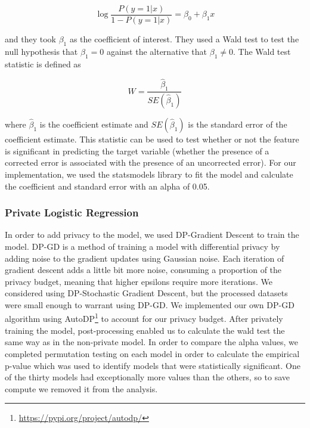 \documentclass[12pt,letterpaper]{article}
\begin{document}
\begin{equation}
    \label{eq:logistic_regression}
    \log \frac{P(y=1|x)}{1-P(y=1|x)} = \beta_0 + \beta_1 x
\end{equation}

and they took $\beta_1$ as the coefficient of interest.
They used a Wald test to test the null hypothesis that $\beta_1 = 0$ against the alternative that $\beta_1 \neq 0$.
The Wald test statistic is defined as 

\begin{equation}
    \label{eq:wald_test}
    W = \frac{\hat{\beta}_1}{SE(\hat{\beta}_1)}
\end{equation}

where $\hat{\beta}_1$ is the coefficient estimate and $SE(\hat{\beta}_1)$ is the standard error of the coefficient estimate.
This statistic can be used to test whether or not the feature is significant in predicting the target variable (whether the presence of a corrected error is associated with the presence of an uncorrected error).
For our implementation, we used the statsmodels library to fit the model and calculate the coefficient and standard error with an alpha of 0.05.

\subsubsection{Private Logistic Regression}

In order to add privacy to the model, we used DP-Gradient Descent to train the model.
DP-GD is a method of training a model with differential privacy by adding noise to the gradient updates using Gaussian noise.
Each iteration of gradient descent adds a little bit more noise, consuming a proportion of the privacy budget, 
meaning that higher epsilons require more iterations.
We considered using DP-Stochastic Gradient Descent, but the processed datasets were small enough to warrant using DP-GD.
We implemented our own DP-GD algorithm using AutoDP\footnote{\url{https://pypi.org/project/autodp/}} to account for our privacy budget.
After privately training the model, post-processing enabled us to calculate the wald test the same way as in the non-private model.
In order to compare the alpha values, we completed permutation testing on each model in order to calculate the empirical p-value which was used to identify models that were statistically significant.
One of the thirty models had exceptionally more values than the others, so to save compute we removed it from the analysis.
\end{document}
